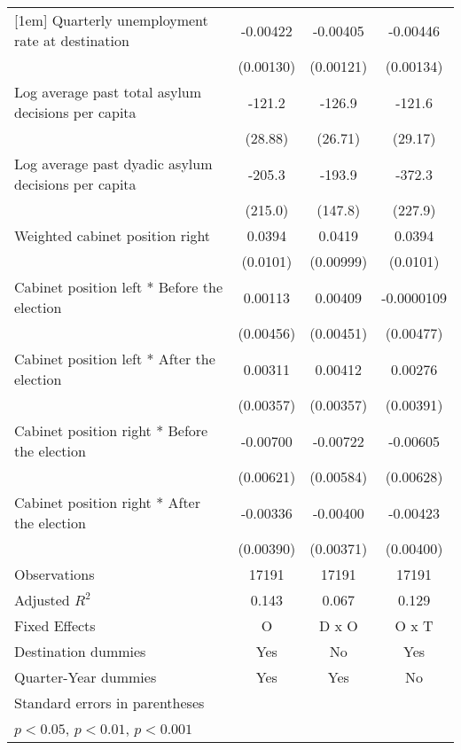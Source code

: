 \begin{table}[htbp]
\begin{tabular}{l*{3}{c}}
[1em]
Quarterly unemployment rate at destination&    -0.00422\sym{**} &    -0.00405\sym{**} &    -0.00446\sym{**} \\
                    &   (0.00130)         &   (0.00121)         &   (0.00134)         \\
[1em]
Log average past total asylum decisions per capita&      -121.2\sym{***}&      -126.9\sym{***}&      -121.6\sym{***}\\
                    &     (28.88)         &     (26.71)         &     (29.17)         \\
[1em]
Log average past dyadic asylum decisions per capita&      -205.3         &      -193.9         &      -372.3         \\
                    &     (215.0)         &     (147.8)         &     (227.9)         \\
[1em]
Weighted cabinet position right&      0.0394\sym{***}&      0.0419\sym{***}&      0.0394\sym{***}\\
                    &    (0.0101)         &   (0.00999)         &    (0.0101)         \\
[1em]
Cabinet position left * Before the election&     0.00113         &     0.00409         &  -0.0000109         \\
                    &   (0.00456)         &   (0.00451)         &   (0.00477)         \\
[1em]
Cabinet position left * After the election&     0.00311         &     0.00412         &     0.00276         \\
                    &   (0.00357)         &   (0.00357)         &   (0.00391)         \\
[1em]
Cabinet position right * Before the election&    -0.00700         &    -0.00722         &    -0.00605         \\
                    &   (0.00621)         &   (0.00584)         &   (0.00628)         \\
[1em]
Cabinet position right * After the election&    -0.00336         &    -0.00400         &    -0.00423         \\
                    &   (0.00390)         &   (0.00371)         &   (0.00400)         \\
\hline
Observations        &       17191         &       17191         &       17191         \\
Adjusted \(R^{2}\)  &       0.143         &       0.067         &       0.129         \\
Fixed Effects       &           O         &       D x O         &       O x T         \\
Destination dummies &         Yes         &          No         &         Yes         \\
Quarter-Year dummies&         Yes         &         Yes         &          No         \\
\hline\hline
\multicolumn{4}{l}{\footnotesize Standard errors in parentheses}\\
\multicolumn{4}{l}{\footnotesize \sym{*} \(p<0.05\), \sym{**} \(p<0.01\), \sym{***} \(p<0.001\)}\\
\end{tabular}
\end{table}
